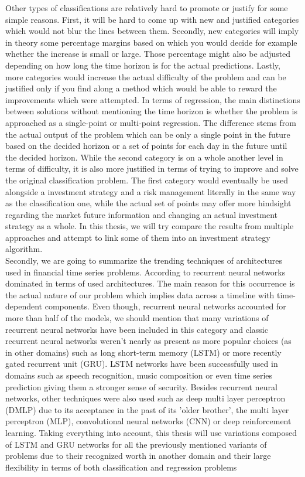 Other types of classifications are relatively hard to promote or justify for some simple reasons. First, it will be hard to come up with new and justified categories which would not blur the lines between them. Secondly, new categories will imply in theory some percentage margins based on which you would decide for example whether the increase is small or large. Those percentage might also be adjusted depending on how long the time horizon is for the actual predictions. Lastly, more categories would increase the actual difficulty of the problem and can be justified only if you find along a method which would be able to reward the improvements which were attempted. In terms of regression, the main distinctions between solutions without mentioning the time horizon is whether the problem is approached as a single-point or multi-point regression. The difference stems from the actual output of the problem which can be only a single point in the future based on the decided horizon or a set of points for each day in the future until the decided horizon. While the second category is on a whole another level in terms of difficulty, it is also more justified in terms of trying to improve and solve the original classification problem. The first category would eventually be used alongside a investment strategy and a risk management literally in the same way as the classification one, while the actual set of points may offer more hindsight regarding the market future information and changing an actual investment strategy as a whole. In this thesis, we will try compare the results from multiple approaches and attempt to link some of them into an investment strategy algorithm.\\

Secondly, we are going to summarize the trending techniques of architectures used in financial time series problems. According to \cite{sezer2020financial} recurrent neural networks dominated in terms of used architectures. The main reason for this occurrence is the actual nature of our problem which implies data across a timeline with time-dependent components. Even though, recurrent neural networks accounted for more than half of the models, we should mention that many variations of recurrent neural networks have been included in this category and classic recurrent neural networks weren't nearly as present as more popular choices (as in other domains) such as long short-term memory (LSTM) or more recently gated recurrent unit (GRU). LSTM networks have been successfully used in domains such as speech recognition, music composition or even time series prediction giving them a stronger sense of security. Besides recurrent neural networks, other techniques were also used such as deep multi layer perceptron (DMLP) due to its acceptance in the past of its 'older brother', the multi layer perceptron (MLP), convolutional neural networks (CNN) or deep reinforcement learning. Taking everything into account, this thesis will use variations composed of LSTM and GRU networks for all the previously mentioned variants of problems due to their recognized worth in another domain and their large flexibility in terms of both classification and regression problems

